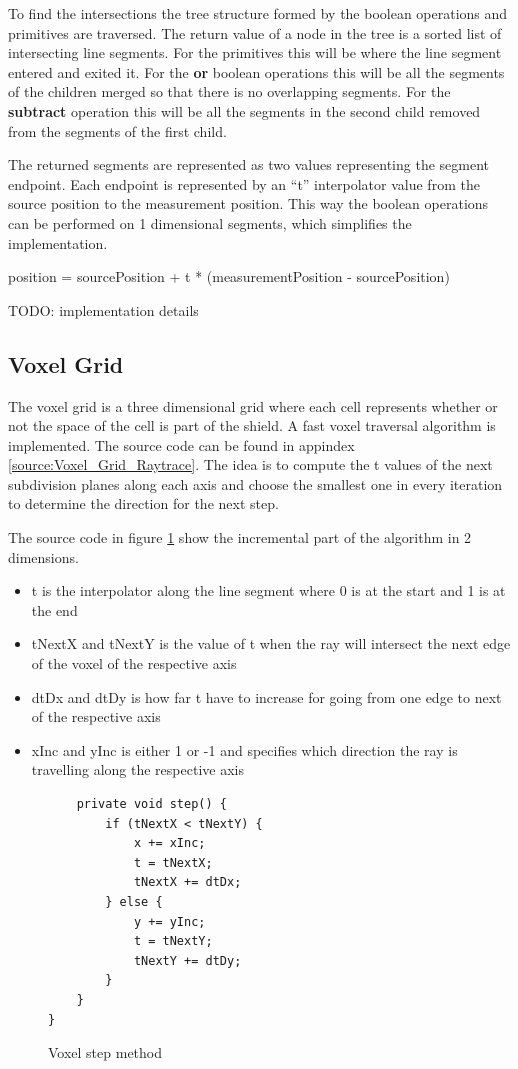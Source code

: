 \documentclass[11pt,twoside,a4paper]{report}
\begin{document}
To find the intersections the tree structure formed by the boolean operations and primitives are traversed. The return value of a node in the tree is a sorted list of intersecting line segments. For the primitives this will be where the line segment entered and exited it. For the \textbf{or} boolean operations this will be all the segments of the children merged so that there is no overlapping segments. For the \textbf{subtract} operation this will be all the segments in the second child removed from the segments of the first child.

The returned segments are represented as two values representing the segment endpoint. Each endpoint is represented by an “t” interpolator value from the source position to the measurement position. This way the boolean operations can be performed on 1 dimensional segments, which simplifies the implementation.

position = sourcePosition + t * (measurementPosition - sourcePosition)

TODO: implementation details

\subsection{Voxel Grid}
The voxel grid is a three dimensional grid where each cell represents whether or not the space of the cell is part of the shield. A fast voxel traversal algorithm \cite{amanatides1987fast} is implemented. The source code can be found in appindex \ref{source:Voxel_Grid_Raytrace}. The idea is to compute the t values of the next subdivision planes along each axis and choose the smallest one in every iteration to determine the direction for the next step.

The source code in figure \ref{fig:voxel_step} show the incremental part of the algorithm in 2 dimensions. 
\begin{itemize}
\item t is the interpolator along the line segment where 0 is at the start and 1 is at the end
\item tNextX and tNextY is the value of t when the ray will intersect the next edge of the voxel of the respective axis
\item dtDx and dtDy is how far t have to increase for going from one edge to next of the respective axis
\item xInc and yInc is either 1 or -1 and specifies which direction the ray is travelling along the respective axis
\end{itemize}
\begin{figure}[h]
    \centering
\begin{lstlisting}
    private void step() {
        if (tNextX < tNextY) {
            x += xInc;
            t = tNextX;
            tNextX += dtDx;
        } else {
            y += yInc;
            t = tNextY;
            tNextY += dtDy;
        }
    }
}
\end{lstlisting}
    \caption{Voxel step method}
	\label{fig:voxel_step}
\end{figure}
\end{document}
